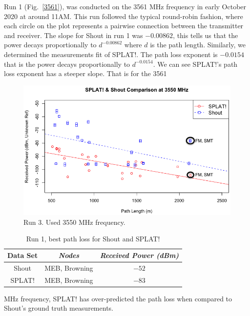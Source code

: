 Run 1 (Fig.~\ref{3561}), was conducted on the 3561 MHz frequency in early October 2020 at around 11AM. This run followed
the typical round-robin fashion, where each circle on the plot represents a pairwise connection between the transmitter and receiver. 
The slope for Shout in run 1 was $-0.00862$, this tells us that the power decays proportionally to $d^{-0.00862}$ where $d$ is the 
path length. Similarly, we determined the measurements fit of SPLAT!. The path loss exponent is $-0.0154$ that is the power decays 
proportionally to $d^{-0.0154}$. We can see SPLAT!'s path loss exponent has a steeper slope. That is for the 3561 
\begin{figure}[htbp]
\centerline{\includegraphics[width=0.9\columnwidth]{figs/3550.png}}
\vspace{-3mm}
\caption{Run 3. Used 3550 MHz frequency.}
\label{3550}
\vspace{-3mm}
\end{figure}
\begin{table}[htbp]
\caption{Run 1, best path loss for Shout and SPLAT!}
\begin{center}
\begin{tabular}{|c|c|c|}
\hline
\textbf{Data Set} & \textbf{\textit{Nodes}}& \textbf{\textit{Received Power (dBm)}} \\
\hline
Shout& MEB, Browning& $-52$ \\
SPLAT!& MEB, Browning& $-83$ \\
\hline
\end{tabular}
\vspace{-3mm}
\label{tab2}
\end{center}
\end{table}
MHz frequency, SPLAT! has over-predicted the path loss when compared to Shout's ground truth measurements. 

